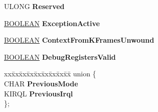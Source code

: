 \begin{DoxyCompactItemize}
\begin{tabbing}
\end{tabbing}\item 
\mbox{\label{struct___k_t_r_a_p___f_r_a_m_e_a2d60f37d96fb54db54b32a6c06fdf129}} 
U\+L\+O\+NG {\bfseries Reserved}
\item 
\mbox{\label{struct___k_t_r_a_p___f_r_a_m_e_a58ecbe087e34c07aa8ddc6ded77d33cb}} 
\hyperlink{_processor_bind_8h_a112e3146cb38b6ee95e64d85842e380a}{B\+O\+O\+L\+E\+AN} {\bfseries Exception\+Active}
\item 
\mbox{\label{struct___k_t_r_a_p___f_r_a_m_e_ae17833f8cea2b9fd3aef79b099cc1ebe}} 
\hyperlink{_processor_bind_8h_a112e3146cb38b6ee95e64d85842e380a}{B\+O\+O\+L\+E\+AN} {\bfseries Context\+From\+K\+Frames\+Unwound}
\item 
\mbox{\label{struct___k_t_r_a_p___f_r_a_m_e_a495d16c0f9591cf7e764b20ec6bc480c}} 
\hyperlink{_processor_bind_8h_a112e3146cb38b6ee95e64d85842e380a}{B\+O\+O\+L\+E\+AN} {\bfseries Debug\+Registers\+Valid}
\item 
\mbox{\label{struct___k_t_r_a_p___f_r_a_m_e_aff0b2eac017d96738de1243b61ac3b72}} 
\begin{tabbing}
xx\=xx\=xx\=xx\=xx\=xx\=xx\=xx\=xx\=\kill
union \{\\
\>CHAR {\bfseries PreviousMode}\\
\>KIRQL {\bfseries PreviousIrql}\\
\}; \\


\end{tabbing}
\end{DoxyCompactItemize}
